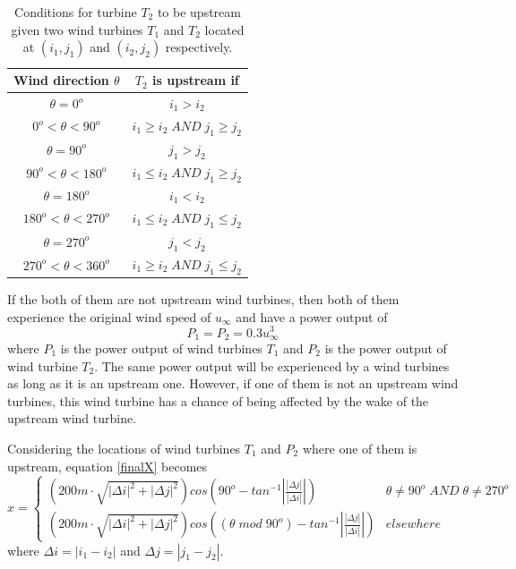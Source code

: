     \begin{table}[h]
        \centering
        \begin{tabular}{|c|c|} \hline
            Wind direction $\theta$ & $T_2$ is upstream if \\ \hline
            $\theta = 0^o$ & $i_1>i_2$ \\ \hline
            $0^o<\theta<90^o$ & $i_1 \geq i_2 \;AND\; j_1 \geq j_2$ \\ \hline
            $\theta = 90^o$ & $j_1>j_2$ \\ \hline
            $90^o<\theta<180^o$ & $i_1 \leq i_2 \;AND\; j_1 \geq j_2$ \\ \hline
            $\theta = 180^o$ & $i_1<i_2$ \\ \hline
            $180^o<\theta<270^o$ & $i_1 \leq i_2 \;AND\; j_1 \leq j_2$ \\ \hline
            $\theta = 270^o$ & $j_1<j_2$ \\ \hline
            $270^o<\theta<360^o$ & $i_1 \geq i_2 \;AND\; j_1 \leq j_2$ \\ \hline
        \end{tabular}
        \caption{Conditions for turbine $T_2$ to be upstream given two wind turbines $T_1$ and $T_2$ located at $(i_1,j_1)$ and $(i_2,j_2)$ respectively.}
        \label{coverage2}
    \end{table}
    
    If the both of them are not upstream wind turbines, then both of them experience the original wind speed of $u_\infty$ and have a power output of
    \begin{equation}
        P_1=P_2=0.3u_\infty^3
    \end{equation}
    where $P_1$ is the power output of wind turbines $T_1$ and $P_2$ is the power output of wind turbine $T_2$. The same power output will be experienced by a wind turbines as long as it is an upstream one. However, if one of them is not an upstream wind turbines, this wind turbine has a chance of being affected by the wake of the upstream wind turbine.
    
    Considering the locations of wind turbines $T_1$ and $P_2$ where one of them is upstream, equation \ref{finalX} becomes
    \begin{equation} \label{xSmall}
        x =
        \begin{cases} 
            \left(200m\cdot\sqrt{\left| \Delta i \right|^2+\left| \Delta j \right|^2}\right)cos\left(90^o-tan^{-1}\left| \frac{\left| \Delta j \right|}{\left| \Delta i \right|} \right| \right) & \theta \neq 90^o \;AND\; \theta \neq 270^o \\
            \left(200m\cdot\sqrt{\left| \Delta i \right|^2+\left| \Delta j \right|^2}\right)cos\left( \left( \theta \;mod\; 90^o \right)-tan^{-1}\left| \frac{\left| \Delta j \right|}{\left| \Delta i \right|} \right| \right) & elsewhere
        \end{cases}
    \end{equation}
    where $\Delta i=|i_1-i_2|$ and $\Delta j=|j_1-j_2|$.
    
